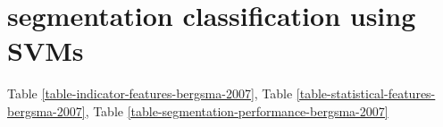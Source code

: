 \section{segmentation classification using SVMs} \label{approach2}





Table \ref{table-indicator-features-bergsma-2007}, 
Table \ref{table-statistical-features-bergsma-2007},
Table \ref{table-segmentation-performance-bergsma-2007}\\

\cite{Nakov:2005}
\cite{Keller:2003}
\cite{Lauer:1995}
\cite{Nicholson:2005}